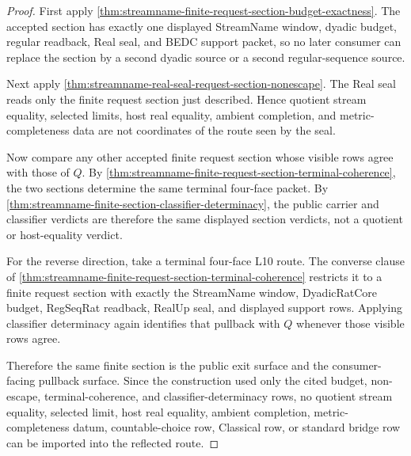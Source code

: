 \begin{proof}
First apply
\autoref{thm:streamname-finite-request-section-budget-exactness}. The accepted
section has exactly one displayed StreamName window, dyadic budget, regular
readback, Real seal, and BEDC support packet, so no later consumer can replace
the section by a second dyadic source or a second regular-sequence source.

Next apply
\autoref{thm:streamname-real-seal-request-section-nonescape}. The Real seal
reads only the finite request section just described. Hence quotient stream
equality, selected limits, host real equality, ambient completion, and
metric-completeness data are not coordinates of the route seen by the seal.

Now compare any other accepted finite request section whose visible rows agree
with those of $Q$. By
\autoref{thm:streamname-finite-request-section-terminal-coherence}, the two
sections determine the same terminal four-face packet. By
\autoref{thm:streamname-finite-section-classifier-determinacy}, the public
carrier and classifier verdicts are therefore the same displayed section
verdicts, not a quotient or host-equality verdict.

For the reverse direction, take a terminal four-face L10 route. The converse
clause of
\autoref{thm:streamname-finite-request-section-terminal-coherence} restricts
it to a finite request section with exactly the StreamName window,
DyadicRatCore budget, RegSeqRat readback, RealUp seal, and displayed support
rows. Applying classifier determinacy again identifies that pullback with
$Q$ whenever those visible rows agree.

Therefore the same finite section is the public exit surface and the
consumer-facing pullback surface. Since the construction used only the cited
budget, non-escape, terminal-coherence, and classifier-determinacy rows, no
quotient stream equality, selected limit, host real equality, ambient
completion, metric-completeness datum, countable-choice row, Classical row, or
standard bridge row can be imported into the reflected route.
\end{proof}

